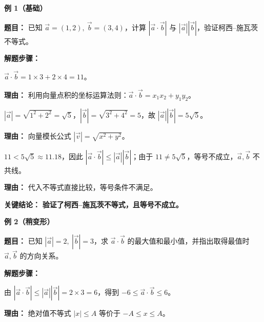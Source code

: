 \begin{examplebox}
	\textbf{\textcolor{CExample}{例 1（基础）}}

	\textbf{\textcolor{CExample}{题目：}} 已知 $\vec{a}=(1,2),\ \vec{b}=(3,4)$，计算 $|\vec{a}\cdot\vec{b}|$ 与 $|\vec{a}||\vec{b}|$，验证柯西–施瓦茨不等式。

	\textbf{\textcolor{CExample}{解题步骤：}}

	\begin{description}[style=nextline, leftmargin=2.8em, labelsep=0.5em, itemsep=0.45em]
		\item[\textbf{第一步（求点积）：}]
		      $\vec{a}\cdot\vec{b}=1\times3+2\times4=11$。
		      \par\textbf{理由：} 利用向量点积的坐标运算法则：$\vec{a}\cdot\vec{b}=x_1x_2+y_1y_2$。

		\item[\textbf{第二步（算模长积）：}]
		      $|\vec{a}|=\sqrt{1^2+2^2}=\sqrt{5}$，$|\vec{b}|=\sqrt{3^2+4^2}=5$，故 $|\vec{a}||\vec{b}|=5\sqrt{5}$。
		      \par\textbf{理由：} 向量模长公式 $|\vec{v}|=\sqrt{x^2+y^2}$。

		\item[\textbf{第三步（比较验证）：}]
		      $11 < 5\sqrt{5}\approx 11.18$，因此 $|\vec{a}\cdot\vec{b}| \le |\vec{a}||\vec{b}|$；由于 $11 \neq 5\sqrt{5}$，等号不成立，$\vec{a},\vec{b}$ 不共线。
		      \par\textbf{理由：} 代入不等式直接比较，等号条件不满足。
	\end{description}

	\textbf{\textcolor{CExample}{关键结论：}} \textbf{验证了柯西–施瓦茨不等式，且等号不成立。}

	\medskip
	\textbf{\textcolor{CExample}{例 2（稍变形）}}

	\textbf{\textcolor{CExample}{题目：}} 已知 $|\vec{a}|=2,\ |\vec{b}|=3$，求 $\vec{a}\cdot\vec{b}$ 的最大值和最小值，并指出取得最值时 $\vec{a},\vec{b}$ 的方向关系。

	\textbf{\textcolor{CExample}{解题步骤：}}

	\begin{description}[style=nextline, leftmargin=2.8em, labelsep=0.5em, itemsep=0.45em]
		\item[\textbf{第一步（应用不等式）：}]
		      由 $|\vec{a}\cdot\vec{b}| \le |\vec{a}||\vec{b}|=2\times3=6$，得到 $-6 \le \vec{a}\cdot\vec{b} \le 6$。
		      \par\textbf{理由：} 绝对值不等式 $|x|\le A$ 等价于 $-A\le x\le A$。


\end{description}
\end{examplebox}
